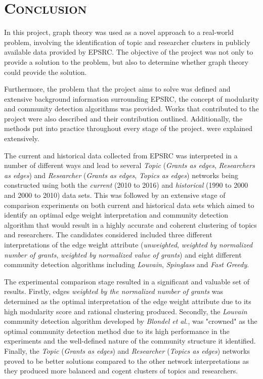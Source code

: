 \chapter{\textsc{Conclusion}}
\label{chapterlabel7}

In this project, graph theory was used as a novel approach to a real-world problem, involving the identification of topic and researcher clusters in publicly available data provided by EPSRC. The objective of the project was not only to provide a solution to the problem, but also to determine whether graph theory could provide the solution.

Furthermore, the problem that the project aims to solve was defined and extensive background information surrounding EPSRC, the concept of modularity and community detection algorithms was provided. Works that contributed to the project were also described and their contribution outlined. Additionally, the methods put into practice throughout every stage of the project. were explained extensively.

The current and historical data collected from EPSRC was interpreted in a number of different ways and lead to several \textit{Topic} (\textit{Grants as edges}, \textit{Researchers as edges}) and \textit{Researcher} (\textit{Grants as edges}, \textit{Topics as edges}) networks being constructed using both the \textit{current} (2010 to 2016) and \textit{historical} (1990 to 2000 and 2000 to 2010) data sets. This was followed by an extensive stage of comparison experiments on both current and historical data sets which aimed to identify an optimal edge weight interpretation and community detection algorithm that would result in a highly accurate and coherent clustering of topics and researchers. The candidates considered included three different interpretations of the edge weight attribute (\textit{unweighted}, \textit{weighted by normalized number of grants}, \textit{weighted by normalized value of grants}) and eight different community detection algorithms including \textit{Louvain}, \textit{Spinglass} and \textit{Fast Greedy}.

The experimental comparison stage resulted in a significant and valuable set of results. Firstly, edges \textit{weighted by the normalized number of grants} was determined as the optimal interpretation of the edge weight attribute due to its high modularity score and rational clustering produced. Secondly, the \textit{Louvain} community detection algorithm developed by \textit{Blondel et al.}, was "crowned" as the optimal community detection method due to its high performance in the experiments and the well-defined nature of the community structure it identified. Finally, the \textit{Topic} (\textit{Grants as edges}) and \textit{Researcher} (\textit{Topics as edges}) networks proved to be better solutions compared to the other network interpretations as they produced more balanced and cogent clusters of topics and researchers.


